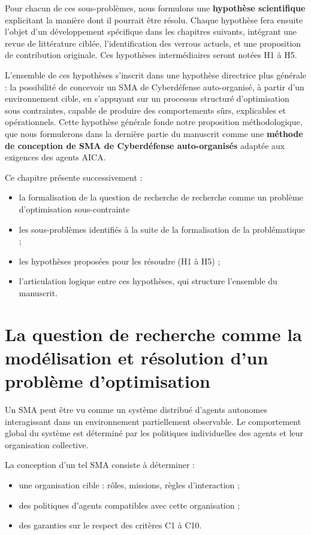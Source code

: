 Pour chacun de ces sous-problèmes, nous formulons une \textbf{hypothèse scientifique} explicitant la manière dont il pourrait être résolu. Chaque hypothèse fera ensuite l'objet d'un développement spécifique dans les chapitres suivants, intégrant une revue de littérature ciblée, l'identification des verrous actuels, et une proposition de contribution originale. Ces hypothèses intermédiaires seront notées H1 à H5.

L'ensemble de ces hypothèses s'inscrit dans une hypothèse directrice plus générale : la possibilité de concevoir un \ac{SMA} de Cyberdéfense auto-organisé, à partir d'un environnement cible, en s'appuyant sur un processus structuré d'optimisation sous contraintes, capable de produire des comportements sûrs, explicables et opérationnels. Cette hypothèse générale fonde notre proposition méthodologique, que nous formulerons dans la dernière partie du manuscrit comme une \textbf{méthode de conception de \ac{SMA} de Cyberdéfense auto-organisés} adaptée aux exigences des agents \ac{AICA}.

Ce chapitre présente successivement :
\begin{itemize}
    \item la formalisation de la question de recherche de recherche comme un problème d'optimisation sous-contrainte
    \item les sous-problèmes identifiés à la suite de la formalisation de la problématique ;
    \item les hypothèses proposées pour les résoudre (H1 à H5) ;
    \item l'articulation logique entre ces hypothèses, qui structure l'ensemble du manuscrit.
\end{itemize}

\section{La question de recherche comme la modélisation et résolution d'un problème d'optimisation}

Un \ac{SMA} peut être vu comme un système distribué d'agents autonomes interagissant dans un environnement partiellement observable. Le comportement global du système est déterminé par les politiques individuelles des agents et leur organisation collective.

La conception d'un tel \ac{SMA} consiste à déterminer :
\begin{itemize}
    \item une organisation cible : rôles, missions, règles d'interaction ;
    \item des politiques d'agents compatibles avec cette organisation ;
    \item des garanties sur le respect des critères C1 à C10.
\end{itemize}

